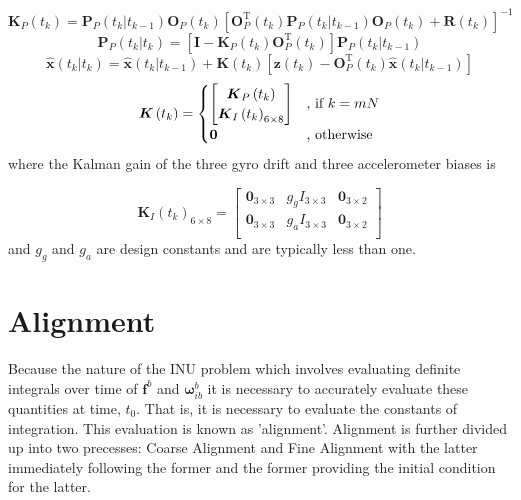 \documentclass[a4paper]{report}
\numberwithin{equation}{chapter}
\newcommand{\mat}[1]{\boldsymbol{#1}}
\begin{document}
\begin{equation}
\mat{K}_P \left( t_k \right) = \mat{P}_P \left( t_k | t_{k - 1} \right) \mat{O}_P \left( t_k \right) \left[ \mat{O}^{\mathrm{T}}_P \left( t_k \right) \mat{P}_P \left( t_k | t_{k - 1} \right) \mat{O}_P \left( t_k \right) + \mat{R} \left( t_k \right) \right]^{-1}
\end{equation}
\begin{equation}
\mat{P}_P \left( t_k | t_k \right) = \left[ \mat{I} - \mat{K}_P \left( t_k \right) \mat{O}_P^{\mathrm{T}} \left( t_k \right) \right] \mat{P}_P \left( t_k | t_{k - 1} \right)
\end{equation}
\begin{equation}
\hat{\mat{x}} \left( t_k | t_k \right) = \hat{\mat{x}} \left( t_k | t_{k - 1} \right) + \mat{K} \left( t_k \right) \left[ \mat{z} \left( t_k \right) - \mat{O}_P^{\mathrm{T}} \left( t_k \right) \hat{\mat{x}} \left( t_k | t_{k - 1} \right) \right]
\end{equation}
\begin{equation}
\mat{K} \left( t_k \right) =
\begin{cases}
\begin{bmatrix}
\mat{K}_P \left( t_k \right)\\
\mat{K}_I \left( t_k \right)_{6 \times 8}\\
\end{bmatrix}
& \text{, if $ k = mN$} \\
\mat{0} & \text{, otherwise}
\end{cases}
\end{equation}
where the Kalman gain of the three gyro drift and three accelerometer biases is

\begin{equation}
\mat{K}_I \left( t_k \right)_{6 \times 8} =
\begin{bmatrix}
\mat{0}_{3 \times 3} & g_g I_{3 \times 3} & \mat{0}_{3 \times 2}\\
\mat{0}_{3 \times 3} & g_a I_{3 \times 3} & \mat{0}_{3 \times 2}\\
\end{bmatrix}
\end{equation}
and $g_g$ and $g_a$ are design constants and are typically less than one.

\section[Alignment]{Alignment}

Because the nature of the INU problem which involves evaluating definite integrals over time of $\mat{f}^b$ and $\mat{\omega}^b_{ib}$ it is necessary to accurately evaluate these quantities at time, $t_0$. That is, it is necessary to evaluate the constants of integration. This evaluation is known as 'alignment'. Alignment is further divided up into two precesses: Coarse Alignment and Fine Alignment with the latter immediately following the former and the former providing the initial condition for the latter.
\end{document}
